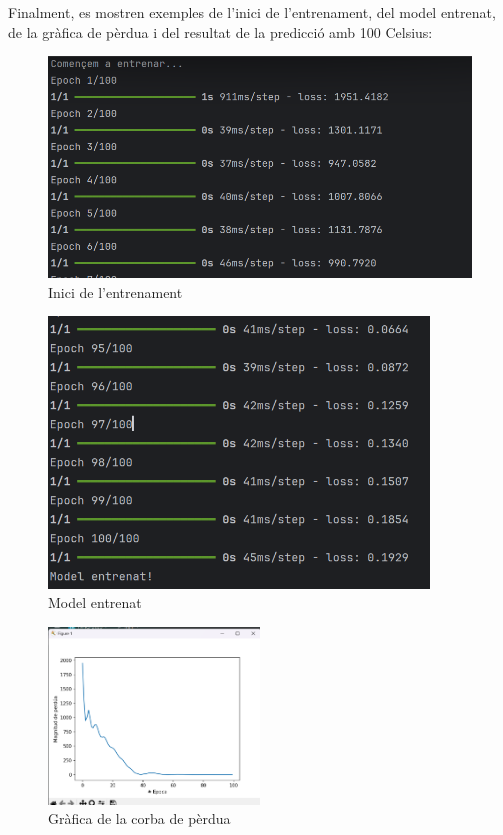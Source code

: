 Finalment, es mostren exemples de l’inici de l’entrenament, del model entrenat, de la gràfica de pèrdua i del resultat de la predicció amb 100 Celsius:

\begin{minipage}{0.45\textwidth}
  \begin{figure}[H]
  \centering
  \includegraphics[width=1\textwidth]{./figures/10.png}
  \caption{Inici de l’entrenament}
  \end{figure}
\end{minipage}
\begin{minipage}{0.45\textwidth}
\begin{figure}[H]
\centering
\includegraphics[width=0.9\textwidth]{./figures/11.png}
\caption{Model entrenat}
\end{figure}
\end{minipage}

\begin{figure}[H]
\centering
\includegraphics[width=0.5\textwidth]{./figures/12.png}
\caption{Gràfica de la corba de pèrdua}
\end{figure}

